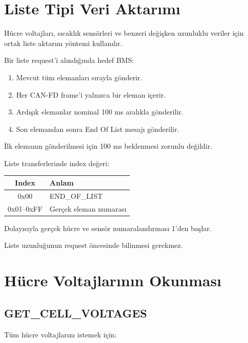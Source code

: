 \documentclass[a4paper,10pt]{article}
\begin{document}
\section{Liste Tipi Veri Aktarımı}

Hücre voltajları, sıcaklık sensörleri ve benzeri değişken uzunluklu
veriler için ortak liste aktarım yöntemi kullanılır.

Bir liste request'i alındığında hedef BMS:

\begin{enumerate}[nosep]
    \item Mevcut tüm elemanları sırayla gönderir.
    \item Her CAN-FD frame'i yalnızca bir eleman içerir.
    \item Ardışık elemanlar nominal 100 ms aralıkla gönderilir.
    \item Son elemandan sonra End Of List mesajı gönderilir.
\end{enumerate}

İlk elemanın gönderilmesi için 100 ms beklenmesi zorunlu değildir.

Liste transferlerinde index değeri:

\begin{center}
\begin{tabular}{c l}
\toprule
\textbf{Index} & \textbf{Anlam} \\
\midrule
0x00 & END\_OF\_LIST \\
0x01--0xFF & Gerçek eleman numarası \\
\bottomrule
\end{tabular}
\end{center}

Dolayısıyla gerçek hücre ve sensör numaralandırması 1'den başlar.

Liste uzunluğunun request öncesinde bilinmesi gerekmez.

\section{Hücre Voltajlarının Okunması}

\subsection{GET\_CELL\_VOLTAGES}

Tüm hücre voltajlarını istemek için:
\end{document}
